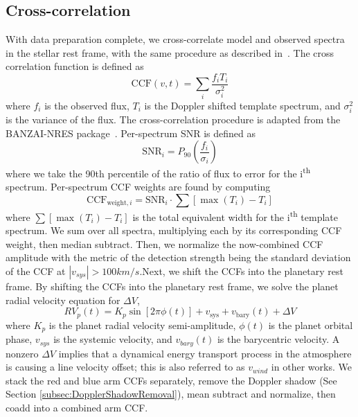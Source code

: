 \documentclass[twocolumn]{aastex631}
\begin{document}
        \subsection{Cross-correlation}\label{subsec:cross-correlation}
            With data preparation complete, we cross-correlate model and observed spectra in the stellar rest frame, with the same procedure as described in~\citet{Johnson2023}. The cross correlation function is defined as
            \begin{equation} \label{equ:CCF}
                \text{CCF}(v,t) = \sum_{i}\frac{f_iT_i}{\sigma_i^{2}} 
            \end{equation} 
            where $f_i$ is the observed flux, $T_i$ is the Doppler shifted template spectrum, and $\sigma_i^2$ is the variance of the flux. The cross-correlation procedure is adapted from the BANZAI-NRES package~\citep{McCully2022}. Per-spectrum SNR is defined as
            \begin{equation} \label{equ:SNR}
                \text{SNR}_i = P_{90}\left(\frac{f_i}{\sigma_i}\right)
            \end{equation}
            where we take the 90th percentile of the ratio of flux to error for the i\textsuperscript{th} spectrum. Per-spectrum CCF weights are found by computing
            \begin{equation}\label{equ:CCF_weight}
                    \text{CCF}_{\text{weight}, i} = \text{SNR}_i  \cdot \sum [ \max(T_i) - T_i ]
            \end{equation}
            where $\sum [ \max(T_i) - T_i ]$ is the total equivalent width for the i\textsuperscript{th} template spectrum.
            We sum over all spectra, multiplying each by its corresponding CCF weight, then median subtract. Then, we normalize the now-combined CCF amplitude with the metric of the detection strength being the standard deviation of the CCF at $|v_{sys}| > 100 km/s$.Next, we shift the CCFs into the planetary rest frame. By shifting the CCFs into the planetary rest frame, we solve the planet radial velocity equation for $\Delta V$,
            \begin{equation} \label{equ:RV_p}
                RV_p(t) = K_p\sin[2\pi\phi(t)] + v_{\text{sys}} + v_{\text{bary}}(t) + \Delta V 
            \end{equation}
            where $K_p$ is the planet radial velocity semi-amplitude, $\phi(t)$ is the planet orbital phase, $v_{sys}$ is the systemic velocity, and $v_{bary}(t)$ is the barycentric velocity. A nonzero $\Delta V$ implies that a dynamical energy transport process in the atmosphere is causing a line velocity offset; this is also referred to as $v_{wind}$ in other works. We stack the red and blue arm CCFs separately, remove the Doppler shadow (See Section \ref{subsec:DopplerShadowRemoval}), mean subtract and normalize, then coadd into a combined arm CCF.
\end{document}
